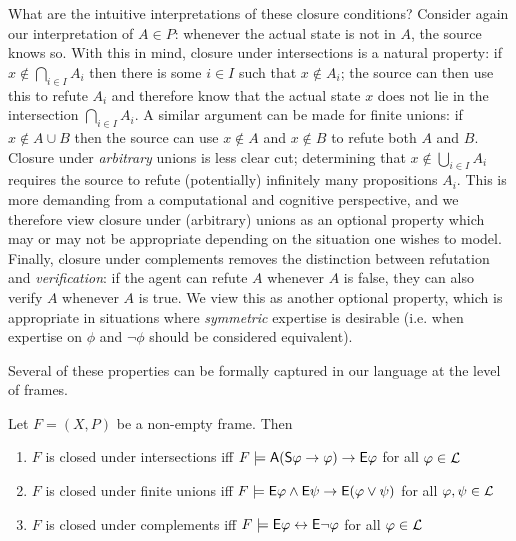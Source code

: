 What are the intuitive interpretations of these closure conditions? Consider
again our interpretation of $A \in P$: whenever the actual state is not in $A$,
the source knows so. With this in mind, closure under intersections is a
natural property: if $x \notin \bigcap_{i \in I}{A_i}$ then there is some $i
\in I$ such that $x \notin A_i$; the source can then use this to refute $A_i$
and therefore know that the actual state $x$ does not lie in the intersection
$\bigcap_{i \in I}{A_i}$. A similar argument can be made for finite unions: if
$x \notin A \cup B$ then the source can use $x \notin A$ and $x \notin B$ to
refute both $A$ and $B$. Closure under \emph{arbitrary} unions is less clear
cut; determining that $x \notin \bigcup_{i \in I}{A_i}$ requires the source to
refute (potentially) infinitely many propositions $A_i$.  This is more
demanding from a computational and cognitive perspective, and we therefore view
closure under (arbitrary) unions as an optional property which may or may not
be appropriate depending on the situation one wishes to model. Finally,
closure under complements removes the distinction between refutation and
\emph{verification}: if the agent can refute $A$ whenever $A$ is false, they
can also verify $A$ whenever $A$ is true. We view this as another optional
property, which is appropriate in situations where \emph{symmetric} expertise
is desirable (i.e. when expertise on $\phi$ and $\neg\phi$ should be considered
equivalent).

Several of these properties can be formally captured in our language at the
level of frames.

\begin{proposition}
\label{exp_prop_frame_conditions}

    Let $F = (X, P)$ be a non-empty frame. Then

    \begin{enumerate}

        \item\label{exp_item_frame_condition_intersections} $F$ is closed under
            intersections iff $F \models \mathsf{A}(\mathsf{S}\varphi \rightarrow \varphi) \rightarrow
            \mathsf{E}\varphi$ for all $\varphi \in \mathcal{L}$

        \item\label{exp_item_frame_condition_finunions} $F$ is closed under finite
            unions iff $F \models \mathsf{E}\varphi \land \mathsf{E}\psi \rightarrow \mathsf{E}(\varphi \lor
            \psi)$ for all $\varphi, \psi \in \mathcal{L}$

        \item\label{exp_item_frame_condition_compl} $F$ is closed under complements
            iff $F \models \mathsf{E}\varphi \leftrightarrow \mathsf{E}\neg\varphi$ for all $\varphi \in \mathcal{L}$

    \end{enumerate}
\end{proposition}


